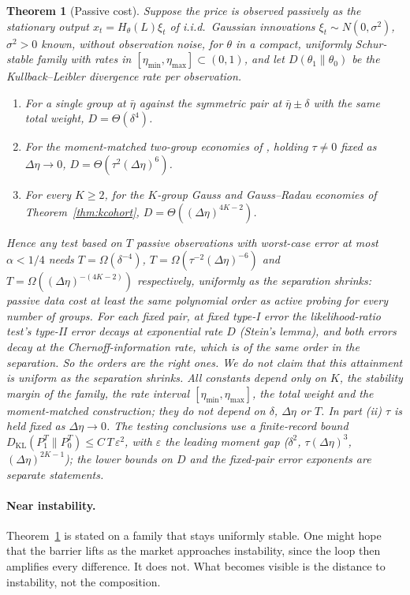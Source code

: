 \documentclass[12pt]{article}
\newtheorem{theorem}{Theorem}[section]
\theoremstyle{definition}
\theoremstyle{remark}
\newcommand{\KL}{D_{\mathrm{KL}}}
\begin{document}
\begin{theorem}[Passive cost]\label{prop:passive}
Suppose the price is observed passively as the stationary output $x_t=H_\theta(L)\xi_t$ of i.i.d.\ Gaussian innovations $\xi_t\sim N(0,\sigma^2)$, $\sigma^2>0$ known, without observation noise, for $\theta$ in a compact, uniformly Schur-stable family with rates in $[\eta_{\min},\eta_{\max}]\subset(0,1)$, and let $D(\theta_1\|\theta_0)$ be the Kullback--Leibler divergence rate per observation.
\begin{enumerate}[label=(\roman*)]
\item For a single group at $\bar\eta$ against the symmetric pair at $\bar\eta\pm\delta$ with the same total weight, $D=\Theta(\delta^4)$.
\item For the moment-matched two-group economies of \citet[Theorem~S11.1]{niroula2026full}, holding $\tau\ne0$ fixed as $\Delta\eta\to0$, $D=\Theta(\tau^2(\Delta\eta)^6)$.
\item For every $K\ge2$, for the $K$-group Gauss and Gauss--Radau economies of Theorem~\ref{thm:kcohort}, $D=\Theta((\Delta\eta)^{4K-2})$.
\end{enumerate}
Hence any test based on $T$ passive observations with worst-case error at most $\alpha<1/4$ needs $T=\Omega(\delta^{-4})$, $T=\Omega(\tau^{-2}(\Delta\eta)^{-6})$ and $T=\Omega((\Delta\eta)^{-(4K-2)})$ respectively, uniformly as the separation shrinks: passive data cost at least the same polynomial order as active probing for every number of groups. For each fixed pair, at fixed type-I error the likelihood-ratio test's type-II error decays at exponential rate $D$ (Stein's lemma), and both errors decay at the Chernoff-information rate, which is of the same order in the separation. So the orders are the right ones. We do not claim that this attainment is uniform as the separation shrinks. All constants depend only on $K$, the stability margin of the family, the rate interval $[\eta_{\min},\eta_{\max}]$, the total weight and the moment-matched construction; they do not depend on $\delta$, $\Delta\eta$ or $T$. In part (ii) $\tau$ is held fixed as $\Delta\eta\to0$. The testing conclusions use a finite-record bound $\KL(P_1^T\|P_0^T)\le C\,T\,\varepsilon^2$, with $\varepsilon$ the leading moment gap ($\delta^2$, $\tau(\Delta\eta)^3$, $(\Delta\eta)^{2K-1}$); the lower bounds on $D$ and the fixed-pair error exponents are separate statements.
\end{theorem}



\paragraph{Near instability.} Theorem~\ref{prop:passive} is stated on a family that stays uniformly stable. One might hope that the barrier lifts as the market approaches instability, since the loop then amplifies every difference. It does not. What becomes visible is the distance to instability, not the composition.
\end{document}
